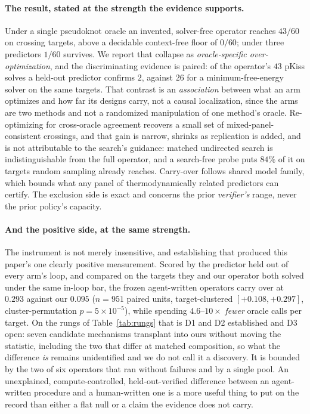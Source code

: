 \documentclass[11pt]{article}
\begin{document}
\paragraph{The result, stated at the strength the evidence supports.} Under a single pseudoknot oracle an
invented, solver-free operator reaches $43/60$ on crossing targets, above a decidable context-free floor of
$0/60$; under three predictors $1/60$ survives. We report that collapse as \emph{oracle-specific
over-optimization}, and the discriminating evidence is paired: of the operator's $43$ pKiss solves a held-out
predictor confirms $2$, against $26$ for a minimum-free-energy solver on the same targets. That contrast is an
\emph{association} between what an arm optimizes and how far its designs carry, not a causal localization,
since the arms are two methods and not a randomized manipulation of one method's oracle. Re-optimizing for
cross-oracle agreement recovers a small set of mixed-panel-consistent crossings, and that gain is narrow,
shrinks as replication is added, and is not attributable to the search's guidance: matched undirected search
is indistinguishable from the full operator, and a search-free probe puts $84\%$ of it on targets random
sampling already reaches. Carry-over follows shared model family, which bounds what any panel of
thermodynamically related predictors can certify. The exclusion side is exact and concerns the prior
\emph{verifier's} range, never the prior policy's capacity.

\paragraph{And the positive side, at the same strength.} The instrument is not merely insensitive, and
establishing that produced this paper's one clearly positive measurement. Scored by the predictor held out of
every arm's loop, and compared on the targets they and our operator both solved under the same in-loop bar,
the frozen agent-written operators carry over at $0.293$ against our $0.095$ ($n{=}951$ paired units,
target-clustered $[{+}0.108,{+}0.297]$, cluster-permutation $p{=}5\!\times\!10^{-5}$), while spending
$4.6$--$10\times$ \emph{fewer} oracle calls per target. On the rungs of Table~\ref{tab:rungs} that is D1 and
D2 established and D3 open: seven candidate mechanisms transplant into ours without moving the statistic,
including the two that differ at matched composition, so what the difference \emph{is} remains unidentified
and we do not call it a discovery. It is bounded by the two of six operators that ran without failures and by
a single pool. An unexplained, compute-controlled, held-out-verified difference between an agent-written
procedure and a human-written one is a more useful thing to put on the record than either a flat null or a
claim the evidence does not carry.
\end{document}
